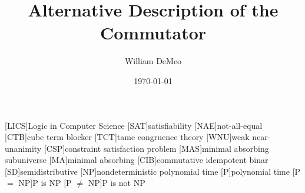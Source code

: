 [LICS]{Logic in Computer Science}
[SAT]{satisfiability}
[NAE]{not-all-equal}
[CTB]{cube term blocker}
[TCT]{tame congruence theory}
[WNU]{weak near-unanimity}
[CSP]{constraint satisfaction problem}
[MAS]{minimal absorbing subuniverse}
[MA]{minimal absorbing}
[CIB]{commutative idempotent binar}
[SD]{semidistributive}
[NP]{nondeterministic polynomial time}
[P]{polynomial time}
[P $ = $ NP]{P is NP}
[P $ \neq $ NP]{P is not NP}


\usepackage{inputs/proof-dashed}



\usepackage{inputs/macros}



\title{Alternative Description of the Commutator}
\date{\today}
\author[W.~DeMeo]{William DeMeo}
\address{University of Hawaii}


\renewcommand{\etaR}{\ensuremath{\eta}}



